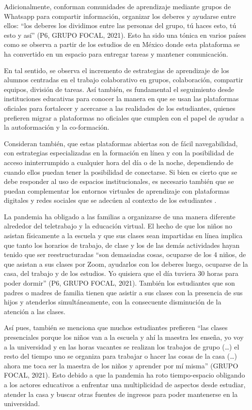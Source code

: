 \documentclass[spanish]{textolivre}
\begin{document}
Adicionalmente, conforman comunidades de aprendizaje mediante grupos de Whatsapp para compartir información, organizar los deberes y ayudarse entre ellos: “los deberes los dividimos entre las personas del grupo, tú haces esto, tú esto y así” (P6, GRUPO FOCAL, 2021). Esto ha sido una tónica en varios países como se observa a partir de los estudios de \textcite{baptista_lucio_encuesta_2020} en México donde esta plataforma se ha convertido en un espacio para entregar tareas y mantener comunicación.

En tal sentido, se observa el incremento de estrategias de aprendizaje de los alumnos centradas en el trabajo colaborativo en grupos, colaboración, compartir equipos, división de tareas. Así también, es fundamental el seguimiento desde instituciones educativas para conocer la manera en que se usan las plataformas oficiales para fortalecer y acercarse a las realidades de los estudiantes, quienes prefieren migrar a plataformas no oficiales que cumplen con el papel de ayudar a la autoformación y la co-formación. 

Consideran también, que estas plataformas abiertas son de fácil navegabilidad, con estrategias especializadas en la formación en línea y con la posibilidad de acceso ininterrumpido a cualquier hora del día o de la noche, dependiendo de cuando ellos puedan tener la posibilidad de conectarse. Si bien es cierto que se debe responder al uso de espacios institucionales, es necesario también que se puedan complementar los entornos virtuales de aprendizaje con plataformas digitales y redes sociales que se adecúen al contexto de los estudiantes \cite{perez-gomez_educarse_2012}.

La pandemia ha obligado a las familias a organizarse de una manera diferente alrededor del teletrabajo y la educación virtual. El hecho de que los niños no asistan físicamente a la escuela y que sus clases sean impartidas en línea implica que tanto los horarios de trabajo, de clase y los de las demás actividades hayan tenido que ser reestructuradas “son demasiadas cosas, ocuparse de los 4 niños, de que asistan a sus clases por Zoom, ayudarlos con los deberes luego, ocuparse de la casa, del trabajo y de los estudios. Yo quisiera que el día tuviera 30 horas para poder dormir” (P6, GRUPO FOCAL, 2021). También los estudiantes que son padres o madres de familia tienen que asistir a sus clases con la presencia de sus hijos y atenderlos simultáneamente, con la consecuente disminución de la atención a las clases.

Así pues, también se menciona que muchos estudiantes prefieren “las clases presenciales porque los niños van a la escuela y ahí la maestra les enseña, yo voy a la universidad y en las horas vacantes se realizan los trabajos de grupo (…)  el resto del tiempo uno se organiza para trabajar o hacer las cosas de la casa (…) ahora me toca ser la maestra de los niños y aprender por mí misma” (GRUPO FOCAL, 2021). Esto debido a que la pandemia ha roto tiempo-espacio obligando a los actores educativos a enfrentar una multiplicidad de aspectos desde estudiar, atender la casa y buscar otras fuentes de ingresos para poder mantenerse en la universidad. 
\end{document}
